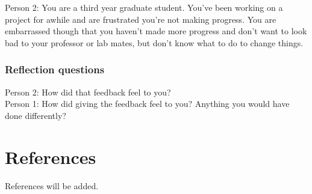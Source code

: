 \documentclass[
  letterpaper,
  DIV=11,
  numbers=noendperiod]{scrreprt}
\newlength{\cslhangindent}
\newlength{\cslentryspacingunit} %
\newenvironment{CSLReferences}[2] %
 {%
  \setlength{\parindent}{0pt}
  \ifodd #1
  \let\oldpar\par
  \def\par{\hangindent=\cslhangindent\oldpar}
  \fi
  \setlength{\parskip}{#2\cslentryspacingunit}
 }%
 {}
\begin{document}
Person 2: You are a third year graduate student. You've been working on
a project for awhile and are frustrated you're not making progress. You
are embarrassed though that you haven't made more progress and don't
want to look bad to your professor or lab mates, but don't know what to
do to change things.

\hypertarget{reflection-questions-1}{%
\subsection*{Reflection questions}\label{reflection-questions-1}}

Person 2: How did that feedback feel to you?\\
Person 1: How did giving the feedback feel to you? Anything you would
have done differently?

\hypertarget{references}{%
\chapter*{References}\label{references}}

References will be added.

\hypertarget{refs}{}
\begin{CSLReferences}{0}{0}
\end{CSLReferences}
\end{document}
